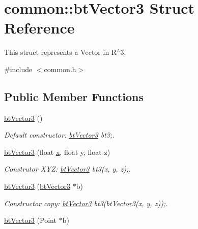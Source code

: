 \hypertarget{structcommon_1_1btVector3}{}\section{common\+:\+:bt\+Vector3 Struct Reference}
\label{structcommon_1_1btVector3}


This struct represents a Vector in R$^\wedge$3.  




{\ttfamily \#include $<$common.\+h$>$}

\subsection*{Public Member Functions}
\begin{DoxyCompactItemize}
\item 
\hyperlink{structcommon_1_1btVector3_a18054312f8905cc98697fe4b5918b92a}{bt\+Vector3} ()\hypertarget{structcommon_1_1btVector3_a18054312f8905cc98697fe4b5918b92a}{}\label{structcommon_1_1btVector3_a18054312f8905cc98697fe4b5918b92a}

\begin{DoxyCompactList}\small\item\em Default constructor\+: \hyperlink{structcommon_1_1btVector3}{bt\+Vector3} bt3;. \end{DoxyCompactList}\item 
\hyperlink{structcommon_1_1btVector3_a966ab1cbf7a9f4661ff9ab574466ad9f}{bt\+Vector3} (float \hyperlink{structcommon_1_1btVector3_adbe23ed6ae54734cbdf7b37788e0c702}{x}, float y, float z)\hypertarget{structcommon_1_1btVector3_a966ab1cbf7a9f4661ff9ab574466ad9f}{}\label{structcommon_1_1btVector3_a966ab1cbf7a9f4661ff9ab574466ad9f}

\begin{DoxyCompactList}\small\item\em Construtor X\+YZ\+: \hyperlink{structcommon_1_1btVector3}{bt\+Vector3} bt3(x, y, z);. \end{DoxyCompactList}\item 
\hyperlink{structcommon_1_1btVector3_aaed6af5e7b2e6217483dffa991ecffd4}{bt\+Vector3} (\hyperlink{structcommon_1_1btVector3}{bt\+Vector3} $\ast$b)\hypertarget{structcommon_1_1btVector3_aaed6af5e7b2e6217483dffa991ecffd4}{}\label{structcommon_1_1btVector3_aaed6af5e7b2e6217483dffa991ecffd4}

\begin{DoxyCompactList}\small\item\em Constructor copy\+: \hyperlink{structcommon_1_1btVector3}{bt\+Vector3} bt3(bt\+Vector3(x, y, z));. \end{DoxyCompactList}\item 
\hyperlink{structcommon_1_1btVector3_a276502eb04ec63d64566fa32c67f96fe}{bt\+Vector3} (Point $\ast$b)\hypertarget{structcommon_1_1btVector3_a276502eb04ec63d64566fa32c67f96fe}{}\label{structcommon_1_1btVector3_a276502eb04ec63d64566fa32c67f96fe}


\end{DoxyCompactItemize}
